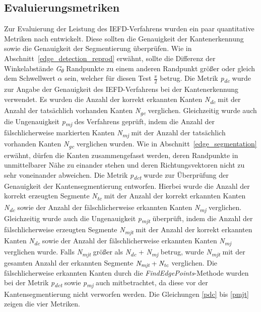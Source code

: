 \subsection{Evaluierungsmetriken} \label{evaluations_metrics}
Zur Evaluierung der Leistung des IEFD-Verfahrens wurden ein paar quantitative Metriken nach \textcite[10]{ni_edge_2016} entwickelt. Diese sollten die Genauigkeit der Kantenerkennung sowie die Genauigkeit der Segmentierung überprüfen. Wie in Abschnitt~\ref{edge_detection_reprod} erwähnt, sollte die Differenz der Winkelabstände \textit{G\textsubscript{$\theta$}} Randpunkte zu einem anderen Randpunkt größer oder gleich dem Schwellwert $\alpha$ sein, welcher für diesen Test $\frac{\pi}{2}$ betrug. Die Metrik \textit{p\textsubscript{dc}} wurde zur Angabe der Genauigkeit des IEFD-Verfahrens bei der Kantenerkennung verwendet. Es wurden die Anzahl der korrekt erkannten Kanten \textit{N\textsubscript{dc}} mit der Anzahl der tatsächlich vorhanden Kanten \textit{N\textsubscript{gc}} verglichen. Gleichzeitig wurde auch die Ungenauigkeit \textit{p\textsubscript{mj}} des Verfahrens geprüft, indem die Anzahl der fälschlicherweise markierten Kanten \textit{N\textsubscript{mj}} mit der Anzahl der tatsächlich vorhanden Kanten \textit{N\textsubscript{gc}} verglichen wurden. Wie in Abschnitt~\ref{edge_segmentation} erwähnt, dürfen die Kanten zusammengefasst werden, deren Randpunkte in unmittelbarer Nähe zu einander stehen und deren Richtungsvektoren nicht zu sehr voneinander abweichen. Die Metrik \textit{p\textsubscript{dct}} wurde zur Überprüfung der Genauigkeit der Kantensegmentierung entworfen. Hierbei wurde die Anzahl der korrekt erzeugten Segmente \textit{N\textsubscript{tc}} mit der Anzahl der korrekt erkannten Kanten \textit{N\textsubscript{dc}} sowie der Anzahl der fälschlicherweise erkannten Kanten \textit{N\textsubscript{mj}} verglichen. Gleichzeitig wurde auch die Ungenauigkeit \textit{p\textsubscript{mjt}} überprüft, indem die Anzahl der fälschlicherweise erzeugten Segmente \textit{N\textsubscript{mjt}} mit der Anzahl der korrekt erkannten Kanten \textit{N\textsubscript{dc}} sowie der Anzahl der fälschlicherweise erkannten Kanten \textit{N\textsubscript{mj}} verglichen wurde. Falls \textit{N\textsubscript{mjt}} größer als \textit{N\textsubscript{dc}} + \textit{N\textsubscript{mj}} betrug, wurde \textit{N\textsubscript{mjt}} mit der gesamten Anzahl der erkannten Segmente $\textit{N\textsubscript{mjt}} + \textit{N\textsubscript{tc}}$ verglichen. Die fälschlicherweise erkannten Kanten durch die \textit{FindEdgePoints}-Methode wurden bei der Metrik \textit{p\textsubscript{dct}} sowie \textit{p\textsubscript{mj}} auch mitbetrachtet, da diese vor der Kantensegmentierung nicht verworfen werden. Die Gleichungen \ref{pdc} bis \ref{pmjt} zeigen die vier Metriken.

